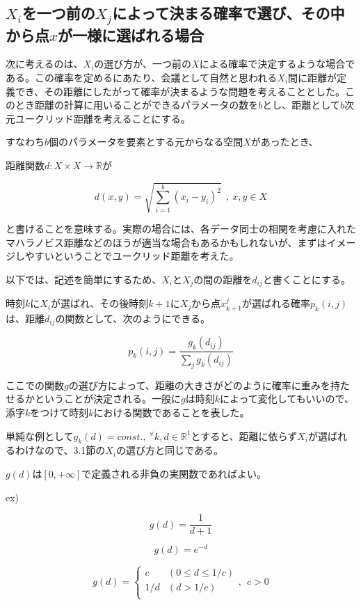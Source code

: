 \subsection{$X_{i}$を一つ前の$X_{j}$によって決まる確率で選び、その中から点$x$が一様に選ばれる場合}

次に考えるのは、$X_{i}$の選び方が、一つ前の$X$による確率で決定するような場合である。この確率を定めるにあたり、会議として自然と思われる$X_{i}$間に距離が定義でき、その距離にしたがって確率が決まるような問題を考えることとした。このとき距離の計算に用いることができるパラメータの数を$b$とし、距離として$b$次元ユークリッド距離を考えることにする。

すなわち$b$個のパラメータを要素とする元からなる空間$X$があったとき、

距離関数$d: X \times X \rightarrow \mathbb{R}$が

$$d(x, y) = \sqrt{\sum_{i=1}^{b}(x_{i}-y_{i})^{2}}\ \ ,\ x,y\in X$$

と書けることを意味する。実際の場合には、各データ同士の相関を考慮に入れたマハラノビス距離などのほうが適当な場合もあるかもしれないが、まずはイメージしやすいということでユークリッド距離を考えた。

以下では、記述を簡単にするため、$X_{i}$と$X_{j}$の間の距離を$d_{ij}$と書くことにする。

時刻$k$に$X_{i}$が選ばれ、その後時刻$k+1$に$X_{j}$から点$x_{k+1}^{j}$が選ばれる確率$p_{k}(i,j)$は、距離$d_{ij}$の関数として、次のようにできる。

$$p_{k}(i,j) = \frac{g_{k}(d_{ij})}{\sum_{j} g_{k}(d_{ij})}$$

ここでの関数$g$の選び方によって、距離の大きさがどのように確率に重みを持たせるかということが決定される。一般に$g$は時刻$k$によって変化してもいいので、添字$k$をつけて時刻$k$における関数であることを表した。

単純な例として$g_{k}(d) = const.,\ ^{\forall}k, d\in \mathbb{R}^{1}$とすると、距離に依らず$X_{i}$が選ばれるわけなので、3.1節の$X_{i}$の選び方と同じである。

$g(d)$は$[0, +\infty]$で定義される非負の実関数であればよい。

ex)

$$g(d) = \frac{1}{d+1}$$

$$g(d) = e^{-d}$$

$$g(d) = \left\{ \begin{array}{ll} c & (0\le d \le 1/c) \\
1/d & (d>1/c) \\
\end{array}\right., \ \ c>0$$

